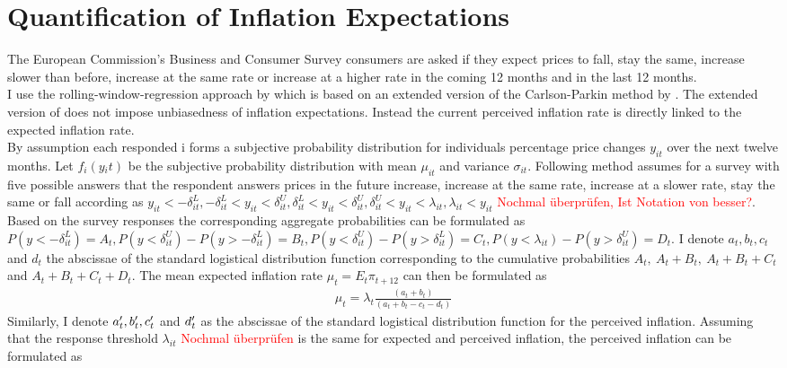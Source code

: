 \documentclass[review]{elsarticle}
\begin{document}
\section{Quantification of Inflation Expectations}\label{sec:Quantification_of_Inflation_Expectations}

The European Commission's Business and Consumer Survey consumers are asked if they expect prices to fall, stay the same, increase slower than before, increase at the same rate or increase at a higher rate in the coming 12 months and in the last 12 months. 
\\
I use the rolling-window-regression approach by \cite{Lahiri2015} which is based on an extended version of the Carlson-Parkin method \citep{Carlson1975} by \cite{Berk1999}. The extended version of \cite{Berk1999} does not impose unbiasedness of inflation expectations. Instead the current perceived inflation rate is directly linked to the expected inflation rate.  
\\
By assumption each responded i forms a subjective probability distribution for individuals percentage price changes $y_{it}$ over the next twelve months. Let $f_i(y{_it})$ be the subjective probability distribution with mean $\mu_{it}$ and variance $\sigma_{it}$. Following \cite{Batchelor1988} method assumes for a survey with five possible answers that the respondent answers prices in the future increase, increase at the same rate, increase at a slower rate, stay the same or fall according as $ y_{it} < - \delta_{it}^L, - \delta_{it}^L < y_{it} < \delta_{it}^U , \delta_{it}^L < y_{it} < \delta_{it}^U,  \delta_{it}^U < y_{it} < \lambda_{it}, \lambda_{it} < y_{it}$ \textcolor{red}{Nochmal überprüfen, Ist Notation von \cite{Batchelor1988} besser?}. Based on the survey responses the corresponding aggregate probabilities can be formulated as $P(y <  -\delta_{it}^L) = A_t, P(y < \delta_{it}^U) - P(y > - \delta_{it}^L) = B_t, P(y < \delta_{it}^U) - P(y > \delta_{it}^L) = C_t, P(y < \lambda_{it}) - P(y > \delta_{it}^U) = D_t.$ I denote $a_t, b_t, c_t$ and $ d_t$ the abscissae of the standard logistical distribution function corresponding to the cumulative probabilities $A_t, \ A_t + B_t, \ A_t + B_t + C_t$ and $A_t + B_t + C_t + D_t$. The mean expected inflation rate $\mu_t = E_t \pi_{t+12}$ can then be formulated as 
\begin{align*}
\mu_t = \lambda_t \frac{(a_t + b_t)}{(a_t + b_t - c_t - d_t)}
\end{align*}
Similarly, I denote $a_t\sp{\prime}, b_t\sp{\prime}, c_t\sp{\prime}$ and $ d_t\sp{\prime}$ as the abscissae of the standard logistical distribution function for the perceived inflation. Assuming that the response threshold $\lambda_{it}$ \textcolor{red}{Nochmal überprüfen} is the same for expected and perceived inflation, the perceived inflation can be formulated as 
\end{document}
